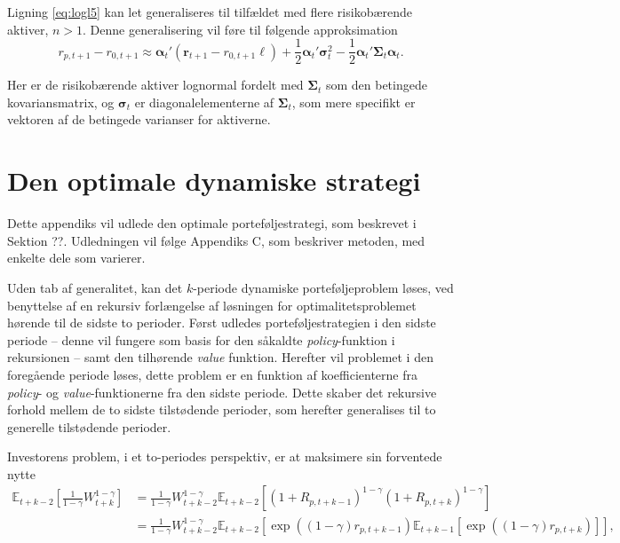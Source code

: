 \documentclass[
  a4paper,
  oneside]{memoir}
\begin{document}
Ligning \eqref{eq:logl5} kan let generaliseres til tilfældet med flere risikobærende aktiver, \(n>1\). Denne generalisering vil føre til følgende approksimation
\begin{equation}
r_{p,t+1} - r_{0,t+1} \approx \bm{\alpha}_t'(\bm{r}_{t+1} - r_{0,t+1}\bm{\ell}) + \frac{1}{2} \bm{\alpha}_t'\bm{\sigma}_t^2 - \frac{1}{2}\bm{\alpha}_t'\bm{\Sigma}_t\bm{\alpha}_t. \label{eq:logl6}
\end{equation}

Her er de risikobærende aktiver lognormal fordelt med \(\bm{\Sigma}_t\) som den betingede kovariansmatrix, og \(\bm{\sigma}_t\) er diagonalelementerne af \(\bm{\Sigma}_t\), som mere specifikt er vektoren af de betingede varianser for aktiverne.

\hypertarget{den-optimale-dynamiske-strategi}{%
\chapter{Den optimale dynamiske strategi}\label{den-optimale-dynamiske-strategi}}

Dette appendiks vil udlede den optimale porteføljestrategi, som beskrevet i Sektion ??. Udledningen vil følge \citep{JurVic2011} Appendiks C, som beskriver metoden, med enkelte dele som varierer.

Uden tab af generalitet, kan det \(k\)-periode dynamiske porteføljeproblem løses, ved benyttelse af en rekursiv forlængelse af løsningen for optimalitetsproblemet hørende til de sidste to perioder. Først udledes porteføljestrategien i den sidste periode -- denne vil fungere som basis for den såkaldte \emph{policy}-funktion i rekursionen -- samt den tilhørende \emph{value} funktion. Herefter vil problemet i den foregående periode løses, dette problem er en funktion af koefficienterne fra \emph{policy}- og \emph{value}-funktionerne fra den sidste periode. Dette skaber det rekursive forhold mellem de to sidste tilstødende perioder, som herefter generalises til to generelle tilstødende perioder.

Investorens problem, i et to-periodes perspektiv, er at maksimere sin forventede nytte
\begin{align*}
\mathbb{E}_{t+k-2}[\frac{1}{1-\gamma} W_{t+k}^{1-\gamma}]&=\frac{1}{1-\gamma} W_{t+k-2}^{1-\gamma} \mathbb{E}_{t+k-2}[(1+R_{p,t+k-1})^{1-\gamma}(1+R_{p,t+k})^{1-\gamma}]\\
&=\frac{1}{1-\gamma} W_{t+k-2}^{1-\gamma} \mathbb{E}_{t+k-2}[\exp((1-\gamma) r_{p,t+k-1}) \mathbb{E}_{t+k-1}[\exp((1-\gamma)r_{p,t+k})]],
\end{align*}
\end{document}
